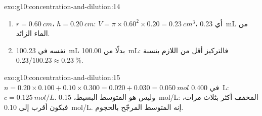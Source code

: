 \begin{solution}{exo:g10:concentration-and-dilution:14}
\begin{enumerate}
  \item $r = \qty{0.60}{cm}$، $h = \qty{0.20}{cm}$:
        $V = \pi \times 0.60^2 \times 0.20 = \qty{0.23}{cm^3}$، أي
        \qty{0.23}{mL} من الماء الزائد.
  \item {} نفسه في \qty{100.23}{mL} بدلًا من \qty{100.00}{mL}:
        فالتركيز أقل من اللازم بنسبة $0.23 / 100.23 \approx
        \qty{0.23}{\percent}$.
\end{enumerate}
\end{solution}

\begin{solution}{exo:g10:concentration-and-dilution:15}
$n = 0.20 \times 0.100 + 0.10 \times 0.300 = 0.020 + 0.030 =
\qty{0.050}{mol}$ في \qty{0.400}{L}: $c = \qty{0.125}{mol/L}$. وليس هو
المتوسط البسيط، \qty{0.15}{mol/L}:  المخفف أكثر بثلاث مرات، فيكون
 أقرب إلى \qty{0.10}{mol/L}. إنه المتوسط المرجّح
بالحجوم.
\end{solution}

